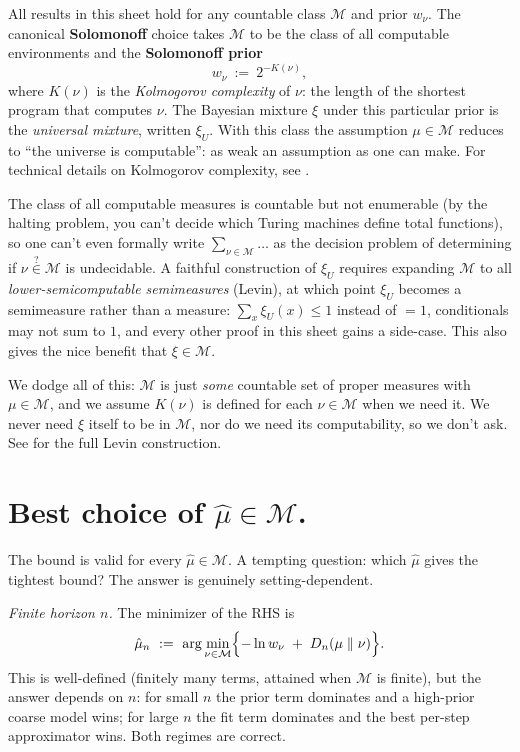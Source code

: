 \documentclass[fontsize=11pt, parskip=half]{scrartcl}
\theoremstyle{definition}
\newcommand{\Mc}{\mathcal{M}}
\begin{document}
All results in this sheet hold for any countable class $\Mc$ and prior $w_\nu$. The canonical \textbf{Solomonoff} choice takes $\Mc$ to be the class of all computable environments and the \textbf{Solomonoff prior}
\[
w_\nu ~:=~ 2^{-K(\nu)},
\]
where $K(\nu)$ is the \emph{Kolmogorov complexity} of $\nu$: the length of the shortest program that computes $\nu$. The Bayesian mixture $\xi$ under this particular prior is the \emph{universal mixture}, written $\xi_U$. With this class the assumption $\mu \in \Mc$ reduces to ``the universe is computable'': as weak an assumption as one can make. For technical details on Kolmogorov complexity, see \cite[\S2.7]{Hutter:24uaibook2}.

The class of all computable measures is countable but not enumerable (by the halting problem, you can't decide which Turing machines define total functions), so one can't even formally write
$\sum_{\nu \in \Mc} \ldots$ as the decision problem of determining if $\nu \overset{?}{\in} \Mc$ is undecidable. A faithful construction of $\xi_U$ requires expanding $\Mc$ to all \emph{lower-semicomputable semimeasures} (Levin), at which point $\xi_U$ becomes a semimeasure rather than a measure: $\sum_x \xi_U(x) \leq 1$ instead of $=1$, conditionals may not sum to $1$, and every other proof in this sheet gains a side-case. This also gives the nice benefit that $\xi \in \mathcal{M}$.

We dodge all of this: $\Mc$ is just \emph{some} countable set of proper measures with $\mu \in \Mc$, and we assume $K(\nu)$ is defined for each $\nu \in \Mc$ when we need it. We never need $\xi$ itself to be in $\Mc$, nor do we need its computability, so we don't ask. See \cite[\S2.4.3]{Hutter:04uaibook} for the full Levin construction.


\section{Best choice of $\hat{\mu} \in \Mc$.}\label{app:best_choice_mu}

The bound is valid for every $\hat\mu \in \Mc$. A tempting question: which
$\hat\mu$ gives the tightest bound? The answer is genuinely setting-dependent.

\textit{Finite horizon $n$.} The minimizer of the RHS is
\[
    \hat\mu_n ~:=~ \arg\min_{\nu \in \Mc}\Bigl\{ -\ln w_\nu \;+\; D_n(\mu \parallel \nu) \Bigr\}.
\]
This is well-defined (finitely many terms, attained when $\Mc$ is finite),
but the answer depends on $n$: for small $n$ the prior term dominates and a
high-prior coarse model wins; for large $n$ the fit term dominates and the best
per-step approximator wins. Both regimes are correct.
\end{document}
